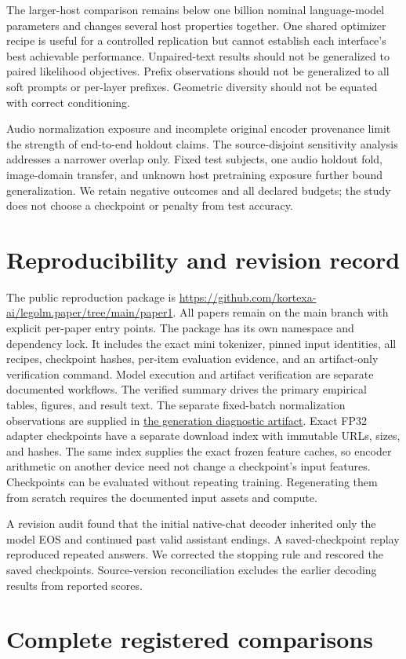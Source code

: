 \documentclass[11pt]{article}
\begin{document}
The larger-host comparison remains below one billion nominal language-model
parameters and changes several host properties together. One shared optimizer
recipe is useful for a controlled replication but cannot establish each
interface's best achievable performance. Unpaired-text results should not be
generalized to paired likelihood objectives. Prefix observations should not be
generalized to all soft prompts or per-layer prefixes. Geometric diversity
should not be equated with correct conditioning.

Audio normalization exposure and incomplete original encoder provenance limit
the strength of end-to-end holdout claims. The source-disjoint sensitivity
analysis addresses a narrower overlap only. Fixed test subjects, one audio
holdout fold, image-domain transfer, and unknown host pretraining exposure
further bound generalization. We retain negative outcomes and all declared
budgets; the study does not choose a checkpoint or penalty from test accuracy.

\section{Reproducibility and revision record}
The public reproduction package is
\url{https://github.com/kortexa-ai/legolm.paper/tree/main/paper1}.
All papers remain on the main branch with explicit per-paper entry points.
The package has its own namespace and dependency lock. It includes the exact
mini tokenizer, pinned input identities, all recipes, checkpoint hashes,
per-item evaluation evidence, and an artifact-only verification command.
Model execution and artifact verification are separate documented workflows.
The verified summary drives the primary empirical tables, figures, and result
text. The separate fixed-batch normalization observations are supplied in
\href{https://github.com/kortexa-ai/legolm.paper/blob/main/paper1/artifacts/revision-2/diagnostics/g-audio-normalization.json}{the generation diagnostic artifact}. Exact FP32 adapter checkpoints have a separate
download index with immutable URLs, sizes, and hashes. The same index supplies
the exact frozen feature caches, so encoder arithmetic on another device need
not change a checkpoint's input features. Checkpoints can be evaluated without
repeating training. Regenerating them from scratch requires the
documented input assets and compute.

A revision audit found that the initial native-chat decoder inherited only
the model EOS and continued past valid assistant endings. A saved-checkpoint
replay reproduced repeated answers. We corrected the stopping rule and
rescored the saved checkpoints. Source-version reconciliation excludes the
earlier decoding results from reported scores.





\clearpage
\appendix
\section{Complete registered comparisons}

\end{document}
